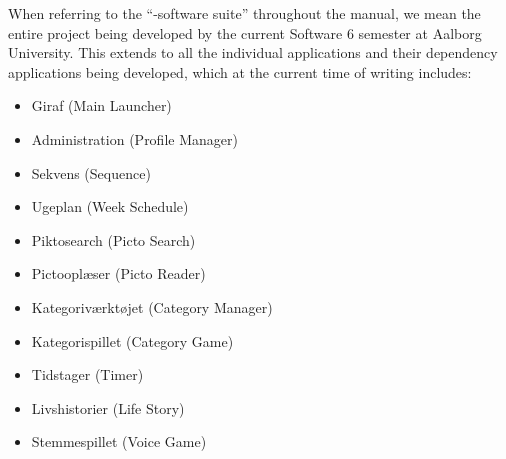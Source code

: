 

\noindent When referring to the ``\giraf-software suite'' throughout the manual, we mean the entire \giraf project being developed by the current Software 6 semester at Aalborg University. This extends to all the individual applications and their dependency applications being developed, which at the current time of writing includes: 

\begin{itemize}
    \item Giraf (Main Launcher)
    \item Administration (Profile Manager)
    \item Sekvens (Sequence)
    \item Ugeplan (Week Schedule)
    \item Piktosearch (Picto Search)
    \item Pictooplæser (Picto Reader)
    \item Kategoriværktøjet (Category Manager)
    \item Kategorispillet (Category Game)
    \item Tidstager (Timer)
    \item Livshistorier (Life Story)
    \item Stemmespillet (Voice Game)
\end{itemize}



